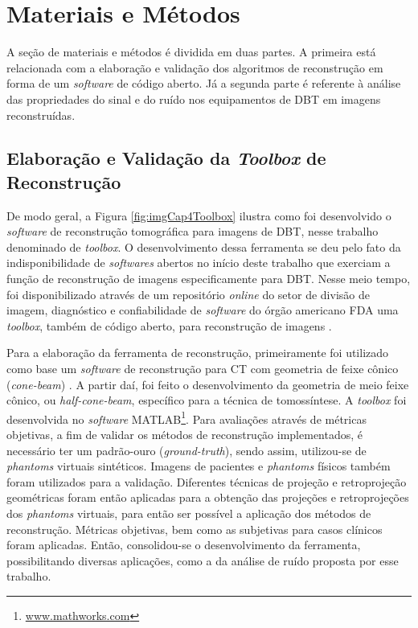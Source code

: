 \chapter[Materiais e Métodos]{Materiais e Métodos}\label{Capitulo5}
 

A seção de materiais e métodos é dividida em duas partes. A primeira está relacionada com a elaboração e validação dos algoritmos de reconstrução em forma de um \textit{software} de código aberto. Já a segunda parte é referente à análise das propriedades do sinal e do ruído nos equipamentos de \acs{DBT} em imagens reconstruídas. 

\section{Elaboração e Validação da \textit{Toolbox} de Reconstrução}

De modo geral, a Figura \ref{fig:imgCap4Toolbox} ilustra como foi desenvolvido o \textit{software} de reconstrução tomográfica para imagens de \acs{DBT}, nesse trabalho denominado de \textit{toolbox}. O desenvolvimento dessa ferramenta se deu pelo fato da indisponibilidade de \textit{softwares} abertos no início deste trabalho que exerciam a  função de reconstrução de imagens especificamente para \acs{DBT}. Nesse meio tempo, foi disponibilizado através de um repositório \textit{online} do setor de divisão de imagem, diagnóstico e confiabilidade de \textit{software} do órgão americano \acs{FDA} uma \textit{toolbox}, também de código aberto, para reconstrução de imagens \cite{Zengtoolbox}.  

Para a elaboração da ferramenta de reconstrução, primeiramente foi utilizado como base um \textit{software} de reconstrução para \acs{CT} com geometria de feixe cônico (\textit{cone-beam}) \cite{kim2012}. A partir daí, foi feito o desenvolvimento da geometria de meio feixe cônico, ou \textit{half-cone-beam}, específico para a técnica de tomossíntese. A \textit{toolbox} foi desenvolvida no \textit{software} MATLAB\footnote{\url{www.mathworks.com}}. Para avaliações através de métricas objetivas, a fim de  validar os métodos de reconstrução implementados, é necessário ter um padrão-ouro (\textit{ground-truth}), sendo assim, utilizou-se de \textit{phantoms} virtuais sintéticos. Imagens de pacientes e \textit{phantoms} físicos também foram utilizados para a validação. Diferentes técnicas de projeção e retroprojeção geométricas foram então aplicadas para a obtenção das projeções e retroprojeções dos \textit{phantoms} virtuais, para então ser possível a aplicação dos métodos de reconstrução. Métricas objetivas, bem como as subjetivas para casos clínicos foram aplicadas. Então, consolidou-se o desenvolvimento da ferramenta, possibilitando diversas aplicações, como a da análise de ruído proposta por esse trabalho.

